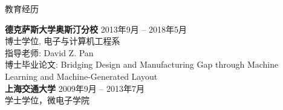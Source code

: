 

\begin{rSection}{教育经历}


{\bf 德克萨斯大学奥斯汀分校} \hfill {2013年9月 -- 2018年5月} \\ 
博士学位, 电子与计算机工程系 \\
指导老师: David Z. Pan \\
博士毕业论文: Bridging Design and Manufacturing Gap through Machine Learning and Machine-Generated Layout \\

{\bf 上海交通大学} \hfill {2009年9月 -- 2013年7月} \\ 
学士学位，微电子学院 \\

\end{rSection}

